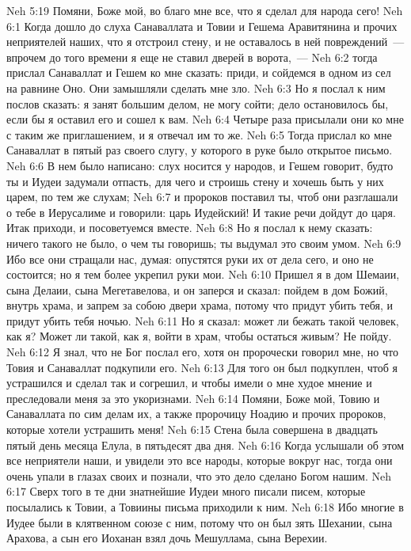 \vs Neh 5:19 Помяни, Боже мой, во благо мне все, что я сделал для народа сего!
\vs Neh 6:1 Когда дошло до слуха Санаваллата и Товии и Гешема Аравитянина и прочих неприятелей наших, что я отстроил стену, и не оставалось в ней повреждений~--- впрочем до того времени я еще не ставил дверей в ворота,~---
\vs Neh 6:2 тогда прислал Санаваллат и Гешем ко мне сказать: приди, и сойдемся в одном из сел на равнине Оно. Они замышляли сделать мне зло.
\vs Neh 6:3 Но я послал к ним послов сказать: я занят большим делом, не могу сойти; дело остановилось бы, если бы я оставил его и сошел к вам.
\vs Neh 6:4 Четыре раза присылали они ко мне с таким же приглашением, и я отвечал им то же.
\vs Neh 6:5 Тогда прислал ко мне Санаваллат в пятый раз своего слугу, у которого в руке было открытое письмо.
\vs Neh 6:6 В нем было написано: слух носится у народов, и Гешем говорит, будто ты и Иудеи задумали отпасть, для чего и строишь стену и хочешь быть у них царем, по тем же слухам;
\vs Neh 6:7 и пророков поставил ты, чтоб они разглашали о тебе в Иерусалиме и говорили: царь Иудейский! И такие речи дойдут до царя. Итак приходи, и посоветуемся вместе.
\vs Neh 6:8 Но я послал к нему сказать: ничего такого не было, о чем ты говоришь; ты выдумал это своим умом.
\vs Neh 6:9 Ибо все они стращали нас, думая: опустятся руки их от дела сего, и оно не состоится; но я тем более укрепил руки мои.
\rsbpar\vs Neh 6:10 Пришел я в дом Шемаии, сына Делаии, сына Мегетавелова, и он заперся и сказал: пойдем в дом Божий, внутрь храма, и запрем за собою двери храма, потому что придут убить тебя, и придут убить тебя ночью.
\vs Neh 6:11 Но я сказал: может ли бежать такой человек, как я? Может ли такой, как я, войти в храм, чтобы остаться живым? Не пойду.
\vs Neh 6:12 Я знал, что не Бог послал его, хотя он пророчески говорил мне, но что Товия и Санаваллат подкупили его.
\vs Neh 6:13 Для того он был подкуплен, чтоб я устрашился и сделал так и согрешил, и чтобы имели о мне худое мнение и преследовали меня за это укоризнами.
\vs Neh 6:14 Помяни, Боже мой, Товию и Санаваллата по сим делам их, а также пророчицу Ноадию и прочих пророков, которые хотели устрашить меня!
\rsbpar\vs Neh 6:15 Стена была совершена в двадцать пятый день месяца Елула, в пятьдесят два дня.
\vs Neh 6:16 Когда услышали об этом все неприятели наши, и увидели это все народы, которые вокруг нас, тогда они очень упали в глазах своих и познали, что это дело сделано Богом нашим.
\rsbpar\vs Neh 6:17 Сверх того в те дни знатнейшие Иудеи много писали писем, которые посылались к Товии, а Товиины письма приходили к ним.
\vs Neh 6:18 Ибо многие в Иудее были в клятвенном союзе с ним, потому что он был зять Шехании, сына Арахова, а сын его Иоханан взял  дочь Мешуллама, сына Верехии.
